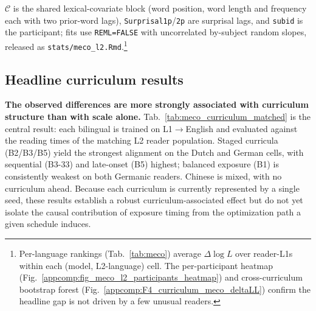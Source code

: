 \noindent $\mathcal{C}$ is the shared lexical-covariate block (word position, word length and frequency each with two prior-word lags), \texttt{Surprisal1p}/\texttt{2p} are surprisal lags, and \texttt{subid} is the participant; fits use \texttt{REML=FALSE} with uncorrelated by-subject random slopes, released as \texttt{stats/meco\_l2.Rmd}.\footnote{Per-language rankings (Tab.~\ref{tab:meco}) average $\Delta\log L$ over reader-L1s within each (model, L2-language) cell. The per-participant heatmap (Fig.~\ref{appcomp:fig_meco_l2_participants_heatmap}) and cross-curriculum bootstrap forest (Fig.~\ref{appcomp:F4_curriculum_meco_deltaLL}) confirm the headline gap is not driven by a few unusual readers.}\label{appcomp:meco}

\subsection{Headline curriculum results}\label{sec:meco-headline-app}

\textbf{The observed differences are more strongly associated with curriculum structure than with scale alone.} Tab.~\ref{tab:meco_curriculum_matched} is the central result: each \beetle{} bilingual is trained on L1$\to$English and evaluated against the reading times of the matching L2 reader population. Staged curricula (B2/B3/B5) yield the strongest alignment on the Dutch and German cells, with sequential (B3-33) and late-onset (B5) highest; balanced exposure (B1) is consistently weakest on both Germanic readers. Chinese is mixed, with no curriculum ahead. Because each curriculum is currently represented by a single seed, these results establish a robust curriculum-associated effect but do not yet isolate the causal contribution of exposure timing from the optimization path a given schedule induces.

